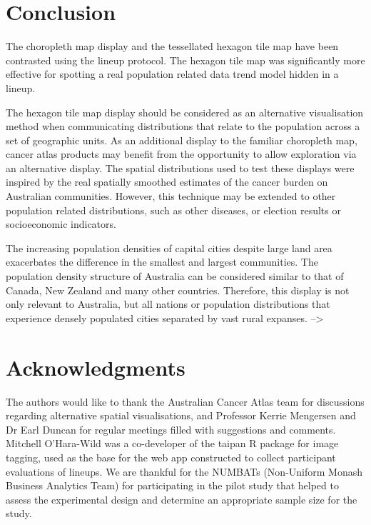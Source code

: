 \documentclass[
doublespace,
  times]{anzsauth}
\begin{document}
\section{Conclusion}\label{conclusion}

The choropleth map display and the tessellated hexagon tile map have
been contrasted using the lineup protocol. The hexagon tile map was
significantly more effective for spotting a real population related data
trend model hidden in a lineup.

The hexagon tile map display should be considered as an alternative
visualisation method when communicating distributions that relate to the
population across a set of geographic units. As an additional display to
the familiar choropleth map, cancer atlas products may benefit from the
opportunity to allow exploration via an alternative display. The spatial
distributions used to test these displays were inspired by the real
spatially smoothed estimates of the cancer burden on Australian
communities. However, this technique may be extended to other population
related distributions, such as other diseases, or election results or
socioeconomic indicators.

The increasing population densities of capital cities despite large land
area exacerbates the difference in the smallest and largest communities.
The population density structure of Australia can be considered similar
to that of Canada, New Zealand and many other countries. Therefore, this
display is not only relevant to Australia, but all nations or population
distributions that experience densely populated cities separated by vast
rural expanses. --\textgreater{}

\section*{Acknowledgments}\label{acknowledgments}

The authors would like to thank the Australian Cancer Atlas team for
discussions regarding alternative spatial visualisations, and Professor
Kerrie Mengersen and Dr Earl Duncan for regular meetings filled with
suggestions and comments. Mitchell O'Hara-Wild was a co-developer of the
taipan \citep{taipan} R package for image tagging, used as the base for
the web app constructed to collect participant evaluations of lineups.
We are thankful for the NUMBATs (Non-Uniform Monash Business Analytics
Team) for participating in the pilot study that helped to assess the
experimental design and determine an appropriate sample size for the
study.
\end{document}
